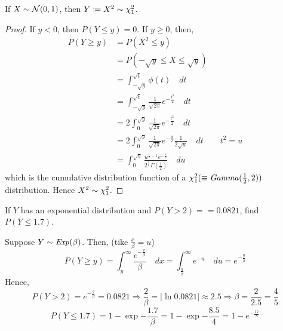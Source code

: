 \begin{theorem}
If $X \sim \mathcal{N}(0, 1)$, then $Y \coloneqq X^2 \sim \chi_{1}^2$.
\end{theorem}
\begin{proof}
If $y < 0$, then $P(Y \leq y) = 0$. If $y \geq 0$, then,
\begin{align*}
    P(Y \geq y) &= P(X^2 \leq y)                                       \\
                &= P(-\sqrt{y} \leq X \leq \sqrt{y})                   \\
                &= \int_{-\sqrt{y}}^{\sqrt{t}} \phi(t) \quad dt        \\
                &= \int_{-\sqrt{y}}^{\sqrt{t}}
                       \frac{1}{\sqrt{2\pi}} e^{-\frac{t^2}{2}}
                   \quad dt                                            \\
                &= 2 \int_{0}^{\sqrt{y}}
                       \frac{1}{\sqrt{2\pi}} e^{-\frac{t^2}{2}}
                   \quad dt                                            \\
                &= 2 \int_{0}^{\sqrt{y}}
                       \frac{1}{\sqrt{2\pi}} e^{-\frac{u}{2}}
                       \frac{1}{2\sqrt{u}}
                   \quad dt \qquad t^2 = u                             \\
                &= \int_{0}^{\sqrt{y}} \frac 
                       {u^{\frac{1}{2} - 1} e^{-\frac{u}{2}}}
                       {2^{\frac{1}{2}} \Gamma(\frac{1}{2})}
                   \quad du
\end{align*}
which is the cumulative distribution function of a $\chi_{1}^2 (\equiv
\text{\emph{Gamma}}(\frac{1}{2}, 2))$ distribution. Hence $X^2 \sim \chi_{1}^2$.
\end{proof}

\begin{example}
If $Y$ has an exponential distribution and $P(Y > 2) == 0.0821$, find $P(Y
\leq 1.7)$.
\end{example}
\begin{solution}
Suppose $Y \sim \text{\emph{Exp}}(\beta)$. Then, (tike $\frac{x}{\beta} = u$)
\[
    P(Y \geq y) = \int_{y}^{\infty} \frac{e^{-\frac{x}{\beta}}}{\beta}
                  \quad dx
                = \int_{\frac{y}{\beta}}^{\infty} e^{-u} \quad du
                = e^{-\frac{y}{\beta}} 
\]
Hence,
\[
    P(Y > 2) = e^{-\frac{2}{\beta}} = 0.0821
    \Rightarrow
    \frac{2}{\beta} = \vert \ln{0.0821} \vert
                    \approx 2.5
    \Rightarrow
    \beta = \frac{2}{2.5} = \frac{4}{5}
\]
\[
    P(Y \leq 1.7) = 1 - \exp{-\frac{1.7}{\beta}}
                  = 1 - \exp{-\frac{8.5}{4}}
                  = 1 - e^{-\frac{17}{8}}
\]
\end{solution}
